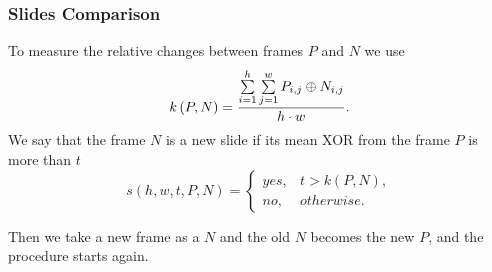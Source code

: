 \begin{frame}
  \frametitle{Slides Comparison}
  To measure the relative changes between frames $P$ and $N$ we use
  \begin{equation}
    k\left(P,N\right)= {\sum\limits_{i=1}^{h}\sum\limits_{j=1}^{w} P_{i,j} \oplus N_{i,j} \over h \cdot w}.
  \end{equation}
  We say that the frame $N$ is a new slide
  if its mean XOR from the frame $P$ is more than $t$
  \begin{equation}
  s\left(h,w,t,P,N\right)= 
      \begin{cases}
        yes,& t > k\left(P,N\right), \\
        no,& otherwise.
      \end{cases}
  \end{equation}
  
  Then we take a new frame as a $N$ and the old $N$ becomes the new $P$,
  and the procedure starts again.
\end{frame}
